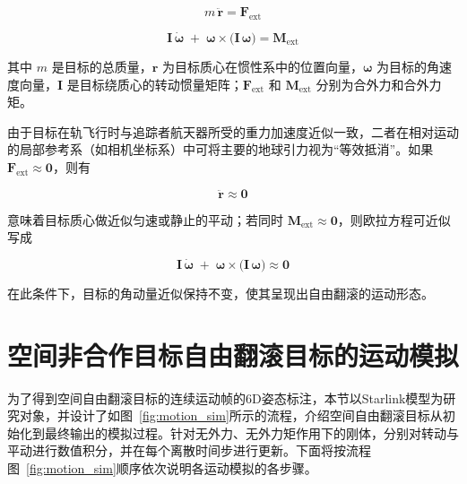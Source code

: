 \begin{equation}
	m\,\ddot{\mathbf{r}} = \mathbf{F}_\mathrm{ext}
\end{equation}

\begin{equation}
	\label{eq:eluar_eq}
	\mathbf{I}\,\dot{\boldsymbol{\omega}}
	\;+\;
	\boldsymbol{\omega} \times \bigl(\mathbf{I}\,\boldsymbol{\omega}\bigr)
	= \mathbf{M}_\mathrm{ext}
\end{equation}

其中 \(m\) 是目标的总质量，\(\mathbf{r}\) 为目标质心在惯性系中的位置向量，\(\boldsymbol{\omega}\) 为目标的角速度向量，\(\mathbf{I}\) 是目标绕质心的转动惯量矩阵；\(\mathbf{F}_\mathrm{ext}\) 和 \(\mathbf{M}_\mathrm{ext}\) 分别为合外力和合外力矩。

由于目标在轨飞行时与追踪者航天器所受的重力加速度近似一致，二者在相对运动的局部参考系（如相机坐标系）中可将主要的地球引力视为“等效抵消”。如果 \(\mathbf{F}_\mathrm{ext} \approx \mathbf{0}\)，则有

\begin{equation}
	\ddot{\mathbf{r}} \approx \mathbf{0}
\end{equation}

意味着目标质心做近似匀速或静止的平动；若同时 \(\mathbf{M}_\mathrm{ext} \approx \mathbf{0}\)，则欧拉方程可近似写成

\begin{equation}
	\mathbf{I}\,\dot{\boldsymbol{\omega}}
	\;+\;
	\boldsymbol{\omega} \times \bigl(\mathbf{I}\,\boldsymbol{\omega}\bigr)
	\approx \mathbf{0}
\end{equation}

在此条件下，目标的角动量近似保持不变，使其呈现出自由翻滚的运动形态。





\section{空间非合作目标自由翻滚目标的运动模拟}
为了得到空间自由翻滚目标的连续运动帧的6D姿态标注，本节以Starlink模型为研究对象，并设计了如图~\ref{fig:motion_sim}所示的流程，介绍空间自由翻滚目标从初始化到最终输出的模拟过程。针对无外力、无外力矩作用下的刚体，分别对转动与平动进行数值积分，并在每个离散时间步进行更新。下面将按流程图~\ref{fig:motion_sim}顺序依次说明各运动模拟的各步骤。


